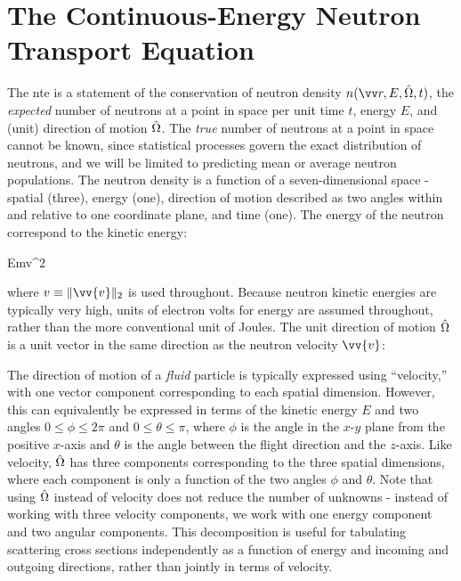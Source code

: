 \section{The Continuous-Energy Neutron Transport Equation}
\label{sec:CE_NTE}

The \gls{nte} is a statement of the conservation of neutron density \(n\seat\), the {\it expected} number of neutrons at a point in space per unit time \(t\), energy \(E\), and (unit) direction of motion \(\hat{\Omega}\). The {\it true} number of neutrons at a point in space cannot be known, since statistical processes govern the exact distribution of neutrons, and we will be limited to predicting mean or average neutron populations. The neutron density is a function of a seven-dimensional space - spatial (three), energy (one), direction of motion described as two angles within and relative to one coordinate plane, and time (one). The energy of the neutron correspond to the kinetic energy:

\beq
E\equiv{}mv^2
\eeq

where \(v\equiv\|\vv{v}\|_2\) is used throughout. Because neutron kinetic energies are typically very high, units of electron volts for energy are assumed throughout, rather than the more conventional unit of Joules. The unit direction of motion \(\hat{\Omega}\) is a unit vector in the same direction as the neutron velocity \(\vv{v}\):

\beq
\label{eq:OmegaDef}
\hO\equiv {}
\eeq

The direction of motion of a {\it fluid} particle is typically expressed using ``velocity,'' with one vector component corresponding to each spatial dimension. However, this can equivalently be expressed in terms of the kinetic energy \(E\) and two angles \(0\leq\phi\leq2\pi\) and \(0\leq\theta\leq\pi\), where \(\phi\) is the angle in the \(x\)-\(y\) plane from the positive \(x\)-axis and \(\theta\) is the angle between the flight direction and the \(z\)-axis. Like velocity, \(\hat{\Omega}\) has three components corresponding to the three spatial dimensions, where each component is only a function of the two angles \(\phi\) and \(\theta\). Note that using \(\hat{\Omega}\) instead of velocity does not reduce the number of unknowns - instead of working with three velocity components, we work with one energy component and two angular components. This decomposition is useful for tabulating scattering cross sections independently as a function of energy and incoming and outgoing directions, rather than jointly in terms of velocity.

